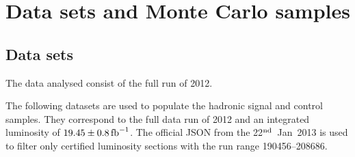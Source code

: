 \clearpage
\section{Data sets and Monte Carlo samples\label{sec:samples}}

\subsection{Data sets\label{sec:datasets}}

The data analysed consist of the full run of 2012.  

  
The following datasets are used to populate the hadronic signal and
control samples. They correspond to the full data run of 2012 and an
integrated luminosity of $19.45 \pm 0.8\mbox{\ensuremath{\,\text{fb}^\text{$-$1}}}$. The official JSON from
the 22$^{\rm nd}$~Jan~2013 is used to filter only certified luminosity
sections with the run range 190456--208686.

